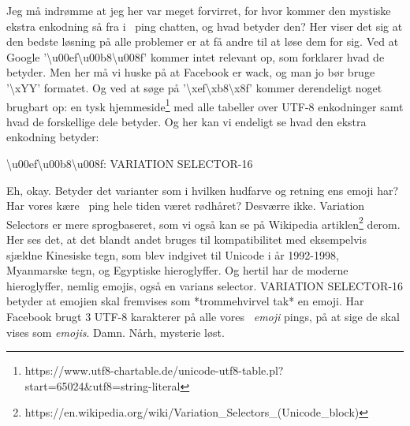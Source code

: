 \begin{article}
Jeg må indrømme at jeg her var meget forvirret, for hvor kommer den mystiske ekstra enkodning så fra i \coffee\ ping chatten, og hvad betyder den?
Her viser det sig at den bedste løsning på alle problemer er at få andre til at løse dem for sig. Ved at Google '\textbackslash u00ef\textbackslash u00b8\textbackslash u008f' kommer intet relevant op, som forklarer hvad de betyder. Men her må vi huske på at Facebook er wack, og man jo bør bruge '\textbackslash xYY' formatet. Og ved at søge på '\textbackslash xef\textbackslash xb8\textbackslash x8f' kommer derendeligt noget brugbart op: en tysk hjemmeside\footnote{https://www.utf8-chartable.de/unicode-utf8-table.pl?start=65024\&utf8=string-literal} med alle tabeller over UTF-8 enkodninger samt hvad de forskellige dele betyder. Og her kan vi endeligt se hvad den ekstra enkodning betyder:
\begin{center}
	\textbackslash u00ef\textbackslash u00b8\textbackslash u008f: VARIATION SELECTOR-16
\end{center}
Eh, okay. Betyder det varianter som i hvilken hudfarve og retning ens emoji har? Har vores kære \coffee\ ping hele tiden været rødhåret? Desværre ikke. Variation Selectors er mere sprogbaseret, som vi også kan se på Wikipedia artiklen\footnote{https://en.wikipedia.org/wiki/Variation\_Selectors\_(Unicode\_block)} derom. Her ses det, at det blandt andet bruges til kompatibilitet med eksempelvis sjældne Kinesiske tegn, som blev indgivet til Unicode i år 1992-1998, Myanmarske tegn, og Egyptiske hieroglyffer. Og hertil har de moderne hieroglyffer, nemlig emojis, også en varians selector. VARIATION SELECTOR-16 betyder at emojien skal fremvises som *trommehvirvel tak* en emoji.
Har Facebook brugt 3 UTF-8 karakterer på alle vores \coffee\ \emph{emoji} pings, på at sige de skal vises som \emph{emojis}. Damn.
Nårh, mysterie løst.


\end{article}
